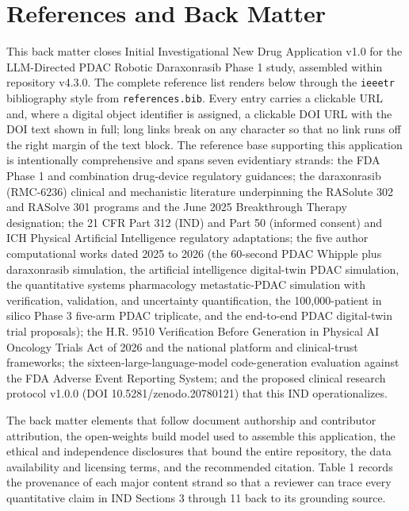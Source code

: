 \section*{References and Back Matter}

This back matter closes Initial Investigational New Drug Application v1.0 for the
LLM-Directed PDAC Robotic Daraxonrasib Phase 1 study, assembled within repository
v4.3.0. The complete reference list renders below through the \texttt{ieeetr}
bibliography style from \texttt{references.bib}. Every entry carries a clickable
URL and, where a digital object identifier is assigned, a clickable DOI URL with
the DOI text shown in full; long links break on any character so that no link runs
off the right margin of the text block. The reference base supporting this
application is intentionally comprehensive and spans seven evidentiary strands:
the FDA Phase 1 and combination drug-device regulatory guidances; the daraxonrasib
(RMC-6236) clinical and mechanistic literature underpinning the RASolute 302 and
RASolve 301 programs and the June 2025 Breakthrough Therapy designation; the
21 CFR Part 312 (IND) and Part 50 (informed consent) and ICH Physical Artificial
Intelligence regulatory adaptations; the five author computational works dated 2025
to 2026 (the 60-second PDAC Whipple plus daraxonrasib simulation, the artificial
intelligence digital-twin PDAC simulation, the quantitative systems pharmacology
metastatic-PDAC simulation with verification, validation, and uncertainty
quantification, the 100,000-patient in silico Phase 3 five-arm PDAC triplicate, and
the end-to-end PDAC digital-twin trial proposals); the H.R. 9510 Verification Before
Generation in Physical AI Oncology Trials Act of 2026 and the national platform and
clinical-trust frameworks; the sixteen-large-language-model code-generation
evaluation against the FDA Adverse Event Reporting System; and the proposed clinical
research protocol v1.0.0 (DOI 10.5281/zenodo.20780121) that this IND operationalizes.

The back matter elements that follow document authorship and contributor
attribution, the open-weights build model used to assemble this application, the
ethical and independence disclosures that bound the entire repository, the data
availability and licensing terms, and the recommended citation. Table 1 records the
provenance of each major content strand so that a reviewer can trace every
quantitative claim in IND Sections 3 through 11 back to its grounding source.


